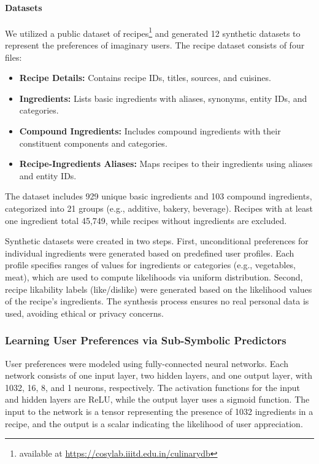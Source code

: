 \paragraph{Datasets}\label{par:datasets-ske-nutrition}
%
We utilized a public dataset of recipes\footnote{available at \url{https://cosylab.iiitd.edu.in/culinarydb}} and generated 12 synthetic datasets to represent the preferences of imaginary users.
%
The recipe dataset consists of four files:
%
\begin{itemize}
  \item \textbf{Recipe Details:} Contains recipe IDs, titles, sources, and cuisines.
  \item \textbf{Ingredients:} Lists basic ingredients with aliases, synonyms, entity IDs, and categories.
  \item \textbf{Compound Ingredients:} Includes compound ingredients with their constituent components and categories.
  \item \textbf{Recipe-Ingredients Aliases:} Maps recipes to their ingredients using aliases and entity IDs.
\end{itemize}
%
The dataset includes 929 unique basic ingredients and 103 compound ingredients, categorized into 21 groups (e.g., additive, bakery, beverage).
%
Recipes with at least one ingredient total 45,749, while recipes without ingredients are excluded.

Synthetic datasets were created in two steps.
%
First, unconditional preferences for individual ingredients were generated based on predefined user profiles.
%
Each profile specifies ranges of values for ingredients or categories (e.g., vegetables, meat), which are used to compute likelihoods via uniform distribution.
%
Second, recipe likability labels (like/dislike) were generated based on the likelihood values of the recipe's ingredients.
%
The synthesis process ensures no real personal data is used, avoiding ethical or privacy concerns.


\subsubsection{Learning User Preferences via Sub-Symbolic Predictors}\label{subsubsec:learning-user-preferences}
%
User preferences were modeled using fully-connected neural networks.
%
Each network consists of one input layer, two hidden layers, and one output layer, with 1032, 16, 8, and 1 neurons, respectively.
%
The activation functions for the input and hidden layers are \gls{ReLU}, while the output layer uses a sigmoid function.
%
The input to the network is a tensor representing the presence of 1032 ingredients in a recipe, and the output is a scalar indicating the likelihood of user appreciation.

